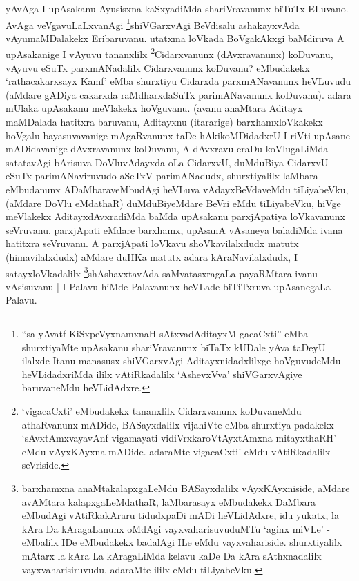 \begin{artha}
yAvAga I upAsakanu Ayusisxna kaSxyadiMda shariVravanunx biTuTx ELuvano. AvAga veVgavuLaLxvanAgi \footnote{``sa yAvatf KiSxpeVyxnamxnaH sAtxvadAditayxM gacaCxti'' eMba shurxtiyaMte upAsakanu shariVravanunx biTaTx kUDale yAva taDeyU ilalxde Itanu manasusx shiVGarxvAgi Aditayxnidadxlilxge hoVguvudeMdu heVLidadxriMda ililx vAtiRkadalilx `AshevxVva' shiVGarxvAgiye baruvaneMdu heVLidAdxre.}shiVGarxvAgi BeVdisalu ashakayxvAda vAyumaMDalakekx Eribaruvanu. utatxma loVkada BoVgakAkxgi baMdiruva A upAsakanige I vAyuvu tananxlilx \footnote{`vigacaCxti' eMbudakekx tananxlilx Cidarxvanunx koDuvaneMdu athaRvanunx mADide, BASayxdalilx vija{\null}hiVte eMba shurxtiya padakekx `sAvxtAmxvayavAnf vigamayati vidiVrxkaroVtAyxtAmxna mitayxthaRH' eMdu vAyxKAyxna mADide. adaraMte vigacaCxti' eMdu vAtiRkadalilx seVriside.}Cidarxvanunx (dAvxravanunx) koDuvanu, vAyuvu eSuTx parxmANadalilx Cidarxvanunx koDuvanu? eMbudakekx `rathacakarxsayx Kamf' eMba shurxtiyu Cidarxda parxmANavanunx heVLuvudu (aMdare gADiya cakarxda raMdharxdaSuTx parimANavanunx koDuvanu). adara mUlaka upAsakanu meVlakekx hoVguvanu. (avanu anaMtara Aditayx maMDalada hatitxra baruvanu, Aditayxnu (itararige) barxhamxloVkakekx hoVgalu bayasuvavanige mAgaRvanunx taDe hAkikoMDidadxrU I riVti upAsane mADidavanige dAvxravanunx koDuvanu, A dAvxravu eraDu koVlugaLiMda satatavAgi bArisuva DoVluvAdayxda oLa CidarxvU, duMduBiya CidarxvU eSuTx parimANaviruvudo aSeTxV parimANadudx, shurxtiyalilx laMbara eMbudanunx ADaMbaraveMbudAgi heVLuva vAdayxBeVdaveMdu tiLiyabeVku, (aMdare DoVlu eMdathaR) duMduBiyeMdare BeVri eMdu tiLiyabeVku, hiVge meVlakekx AditayxdAvxradiMda baMda upAsakanu parxjApatiya loVkavanunx seVruvanu. parxjApati eMdare barxhamx, upAsanA vAsaneya baladiMda ivana hatitxra seVruvanu. A parxjApati loVkavu shoVkavilalxdudx matutx (himavilalxdudx) aMdare duHKa matutx adara kAraNavilalxdudx, I satayxloVkadalilx \footnote{barxhamxna anaMtakalapxgaLeMdu BASayxdalilx vAyxKAyxniside, aMdare avAMtara kalapxgaLeMdathaR, laMbarasayx eMbudakekx DaMbara eMbudAgi vAtiRkakAraru tidudxpaDi mADi heVLidAdxre, idu yukatx, la kAra Da kAragaLanunx oMdAgi vayxvaharisuvuduMTu `aginx miVLe' - eMbalilx IDe eMbudakekx badalAgi ILe eMdu vayxvahariside. shurxtiyalilx mAtarx la kAra La kAragaLiMda kelavu kaDe Da kAra sAthxnadalilx vayxvaharisiruvudu, adaraMte ililx eMdu tiLiyabeVku.}shAshavxtavAda saMvatasxragaLa payaRMtara ivanu vAsisuvanu | I Palavu hiMde Palavanunx heVLade biTiTxruva upAsanegaLa Palavu.
\end{artha}

\centerline{}
